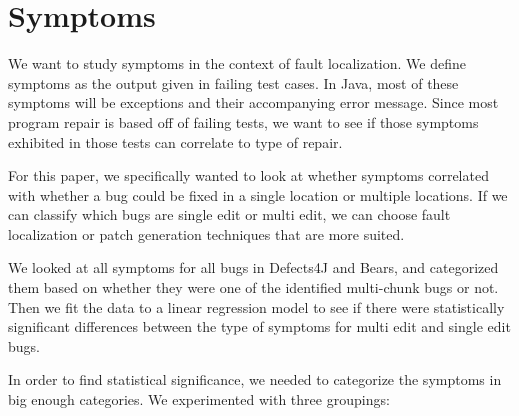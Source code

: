 \section{Symptoms}

We want to study symptoms in the context of fault localization. We define symptoms as the output given in failing test cases. In Java, most of these symptoms will be exceptions and their accompanying error message. Since most program repair is based off of failing tests, we want to see if those symptoms exhibited in those tests can correlate to type of repair.

For this paper, we specifically wanted to look at whether symptoms correlated with whether a bug could be fixed in a single location or multiple locations. If we can classify which bugs are single edit or multi edit, we can choose fault localization or patch generation techniques that are more suited.

We looked at all symptoms for all bugs in Defects4J and Bears, and categorized them based on whether they were one of the identified multi-chunk bugs or not. Then we fit the data to a linear regression model to see if there were statistically significant differences between the type of symptoms for multi edit and single edit bugs.

In order to find statistical significance, we needed to categorize the symptoms in big enough categories. We experimented with three groupings:

